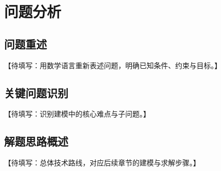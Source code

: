 \section{问题分析}\label{sec:problem_analysis}

\subsection{问题重述}\label{subsec:problem_restatement}

【待填写：用数学语言重新表述问题，明确已知条件、约束与目标。】

\subsection{关键问题识别}\label{subsec:key_issues}

【待填写：识别建模中的核心难点与子问题。】

\subsection{解题思路概述}\label{subsec:solution_overview}

【待填写：总体技术路线，对应后续章节的建模与求解步骤。】
